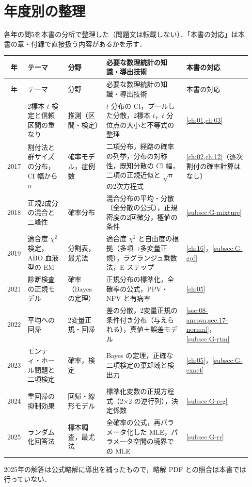 \section{年度別の整理}\label{sec:G-years}
各年の問5を本書の分析で整理した（問題文は転載しない）．「本書の対応」は本書の章・付録で直接扱う内容があるかを示す．
\begin{center}\scriptsize
\setlength{\tabcolsep}{3pt}
\begin{longtable}{@{}cL{30mm}L{30mm}L{48mm}L{22mm}@{}}
\toprule
年 & テーマ & 分野 & 必要な数理統計の知識・導出技術 & 本書の対応\\
\midrule
\endfirsthead
\toprule
年 & テーマ & 分野 & 必要な数理統計の知識・導出技術 & 本書の対応\\
\midrule
\endhead
\bottomrule
{} & 2標本 $t$ 検定と信頼区間の重なり & 推測（区間・検定） & $t$ 分布の CI，プールした分散，2標本 $t$，$t$ 分位点の大小と不等式の整理 & \cref{ch:01,ch:03}\\
2017 & 割付法と群サイズの分布，CI 幅から $n$ & 確率モデル，症例数 & 二項分布，経路の確率の列挙，分布の対称性，既知分散の CI 幅，二項の正規近似と $\sqrt n$ の2次方程式 & \cref{ch:02,ch:12}（逐次割付の確率計算はなし）\\
2018 & 正規2成分の混合と二峰性 & 確率分布 & 混合分布の平均・分散（全分散の公式），正規密度の2回微分，極値の条件 & \cref{subsec:G-mixture}\\
2019 & 適合度 $\chi^2$ 検定，ABO 血液型の EM & 分割表，最尤法 & 適合度 $\chi^2$ と自由度の根拠（多項→多変量正規），ラグランジュ乗数法，E ステップ & \cref{ch:16}，\cref{subsec:G-gof}\\
2021 & 診断検査の正規モデル & 確率（Bayes の定理） & 正規分布の標準化，全確率の公式，PPV・NPV と有病率 & \cref{ch:05}\\
2022 & 平均への回帰 & 2変量正規・回帰 & 差の分散，2変量正規の条件付き分布（与えられる），真値＋誤差モデル & \cref{sec:08-ancova,sec:17-normal}，\cref{subsec:G-rtm}\\
2023 & モンティ・ホール問題と二項検定 & 確率，検定 & Bayes の定理，正確な二項検定の棄却域と検出力 & \cref{ch:05}，\cref{subsec:G-exact}\\
2024 & 重回帰の抑制効果 & 回帰・線形モデル & 標準化変数の正規方程式（2×2 の逆行列），決定係数 & \cref{subsec:G-reg}\\
2025 & ランダム化回答法 & 標本調査，最尤法 & 全確率の公式，再パラメータ化した MLE，パラメータ空間の境界での MLE & \cref{subsec:G-rr}\\
\end{longtable}
\end{center}
2025年の解答は公式略解に導出を補ったもので，略解 PDF との照合は本書では行っていない．

